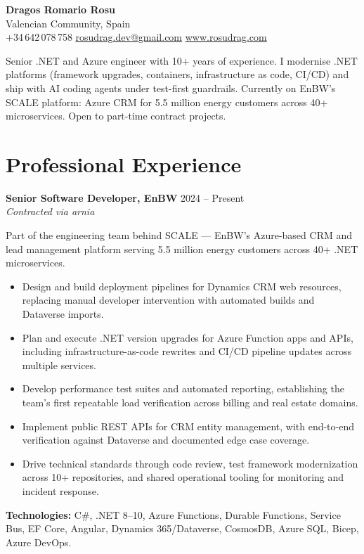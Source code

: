 \documentclass[11pt,a4paper]{article}
\begin{document}
\begin{center}
{\LARGE\bfseries Dragos Romario Rosu}\\[6pt]
Valencian Community, Spain\\[2pt]
\ifdefined\withphone +34\,642\,078\,758 \quad\textbar\quad\fi
\href{mailto:rosudrag.dev@gmail.com}{rosudrag.dev@gmail.com} \quad\textbar\quad
\href{https://www.rosudrag.com/}{www.rosudrag.com}
\end{center}

\vspace{3mm}

Senior .NET and Azure engineer with 10+ years of experience. I modernise .NET platforms (framework upgrades, containers, infrastructure as code, CI/CD) and ship with AI coding agents under test-first guardrails. Currently on EnBW's SCALE platform: Azure CRM for 5.5 million energy customers across 40+ microservices. Open to part-time contract projects.

\vfill

\section{Professional Experience}

\textbf{Senior Software Developer, EnBW} \hfill 2024 -- Present\\
{\itshape Contracted via arnia}

\smallskip
Part of the engineering team behind SCALE --- EnBW's Azure-based CRM and lead management platform serving 5.5 million energy customers across 40+ .NET microservices.
\begin{itemize}
\item Design and build deployment pipelines for Dynamics CRM web resources, replacing manual developer intervention with automated builds and Dataverse imports.
\item Plan and execute .NET version upgrades for Azure Function apps and APIs, including infrastructure-as-code rewrites and CI/CD pipeline updates across multiple services.
\item Develop performance test suites and automated reporting, establishing the team's first repeatable load verification across billing and real estate domains.
\item Implement public REST APIs for CRM entity management, with end-to-end verification against Dataverse and documented edge case coverage.
\item Drive technical standards through code review, test framework modernization across 10+ repositories, and shared operational tooling for monitoring and incident response.
\end{itemize}
\textbf{Technologies:} C\#, .NET 8--10, Azure Functions, Durable Functions, Service Bus, EF Core, Angular, Dynamics 365/Dataverse, CosmosDB, Azure SQL, Bicep, Azure DevOps.
\end{document}
